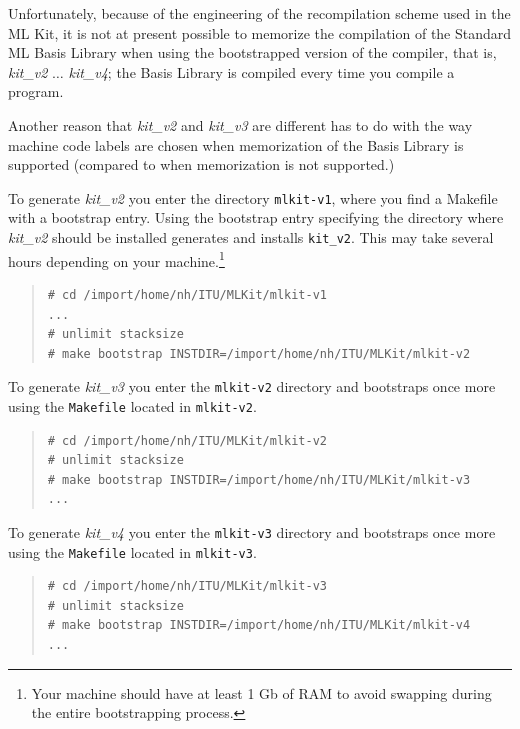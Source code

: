\documentclass[12pt]{book}
\begin{document}
Unfortunately, because of the engineering of the recompilation scheme
used in the ML Kit, it is not at present possible to memorize the
compilation of the Standard ML Basis Library when using the
bootstrapped version of the compiler, that is, \emph{kit\_v2} $\ldots$
\emph{kit\_v4}; the Basis Library is compiled every time you compile a
program.

Another reason that \emph{kit\_v2} and \emph{kit\_v3} are different
has to do with the way machine code labels are chosen when
memorization of the Basis Library is supported (compared to when
memorization is not supported.)

To generate \emph{kit\_v2} you enter the directory \texttt{mlkit-v1},
where you find a Makefile with a bootstrap entry. Using the bootstrap
entry specifying the directory where \emph{kit\_v2} should be
installed generates and installs \texttt{kit\_v2}. This may take
several hours depending on your machine.\footnote{Your machine should
  have at least 1 Gb of RAM to avoid swapping during the entire
  bootstrapping process.}

\begin{small}
\begin{quote}
\begin{verbatim}
# cd /import/home/nh/ITU/MLKit/mlkit-v1
...
# unlimit stacksize
# make bootstrap INSTDIR=/import/home/nh/ITU/MLKit/mlkit-v2
\end{verbatim}
\end{quote}
\end{small}

To generate \emph{kit\_v3} you enter the \texttt{mlkit-v2} directory
and bootstraps once more using the {\tt Makefile} located in
\texttt{mlkit-v2}.

\begin{small}
\begin{quote}
\begin{verbatim}
# cd /import/home/nh/ITU/MLKit/mlkit-v2
# unlimit stacksize
# make bootstrap INSTDIR=/import/home/nh/ITU/MLKit/mlkit-v3
...
\end{verbatim}
\end{quote}
\end{small}

To generate \emph{kit\_v4} you enter the \texttt{mlkit-v3} directory
and bootstraps once more using the {\tt Makefile} located in
\texttt{mlkit-v3}.

\begin{small}
\begin{quote}
\begin{verbatim}
# cd /import/home/nh/ITU/MLKit/mlkit-v3
# unlimit stacksize
# make bootstrap INSTDIR=/import/home/nh/ITU/MLKit/mlkit-v4
...
\end{verbatim}
\end{quote}
\end{small}
\end{document}
